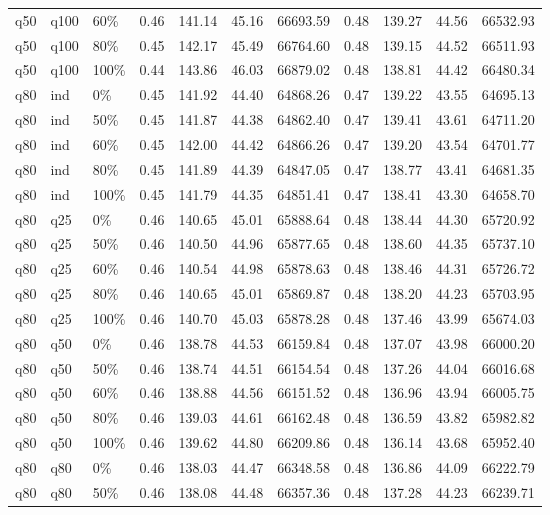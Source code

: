 \begin{longtable}{lllrrrrrrrr}
  q50 & q100 & 60\% & 0.46 & 141.14 & 45.16 & 66693.59 & 0.48 & 139.27 & 44.56 & 66532.93 \\ 
  q50 & q100 & 80\% & 0.45 & 142.17 & 45.49 & 66764.60 & 0.48 & 139.15 & 44.52 & 66511.93 \\ 
  q50 & q100 & 100\% & 0.44 & 143.86 & 46.03 & 66879.02 & 0.48 & 138.81 & 44.42 & 66480.34 \\ 
  q80 & ind & 0\% & 0.45 & 141.92 & 44.40 & 64868.26 & 0.47 & 139.22 & 43.55 & 64695.13 \\ 
  q80 & ind & 50\% & 0.45 & 141.87 & 44.38 & 64862.40 & 0.47 & 139.41 & 43.61 & 64711.20 \\ 
  q80 & ind & 60\% & 0.45 & 142.00 & 44.42 & 64866.26 & 0.47 & 139.20 & 43.54 & 64701.77 \\ 
  q80 & ind & 80\% & 0.45 & 141.89 & 44.39 & 64847.05 & 0.47 & 138.77 & 43.41 & 64681.35 \\ 
  q80 & ind & 100\% & 0.45 & 141.79 & 44.35 & 64851.41 & 0.47 & 138.41 & 43.30 & 64658.70 \\ 
  q80 & q25 & 0\% & 0.46 & 140.65 & 45.01 & 65888.64 & 0.48 & 138.44 & 44.30 & 65720.92 \\ 
  q80 & q25 & 50\% & 0.46 & 140.50 & 44.96 & 65877.65 & 0.48 & 138.60 & 44.35 & 65737.10 \\ 
  q80 & q25 & 60\% & 0.46 & 140.54 & 44.98 & 65878.63 & 0.48 & 138.46 & 44.31 & 65726.72 \\ 
  q80 & q25 & 80\% & 0.46 & 140.65 & 45.01 & 65869.87 & 0.48 & 138.20 & 44.23 & 65703.95 \\ 
  q80 & q25 & 100\% & 0.46 & 140.70 & 45.03 & 65878.28 & 0.48 & 137.46 & 43.99 & 65674.03 \\ 
  q80 & q50 & 0\% & 0.46 & 138.78 & 44.53 & 66159.84 & 0.48 & 137.07 & 43.98 & 66000.20 \\ 
  q80 & q50 & 50\% & 0.46 & 138.74 & 44.51 & 66154.54 & 0.48 & 137.26 & 44.04 & 66016.68 \\ 
  q80 & q50 & 60\% & 0.46 & 138.88 & 44.56 & 66151.52 & 0.48 & 136.96 & 43.94 & 66005.75 \\ 
  q80 & q50 & 80\% & 0.46 & 139.03 & 44.61 & 66162.48 & 0.48 & 136.59 & 43.82 & 65982.82 \\ 
  q80 & q50 & 100\% & 0.46 & 139.62 & 44.80 & 66209.86 & 0.48 & 136.14 & 43.68 & 65952.40 \\ 
  q80 & q80 & 0\% & 0.46 & 138.03 & 44.47 & 66348.58 & 0.48 & 136.86 & 44.09 & 66222.79 \\ 
  q80 & q80 & 50\% & 0.46 & 138.08 & 44.48 & 66357.36 & 0.48 & 137.28 & 44.23 & 66239.71 \\ 

\end{longtable}
